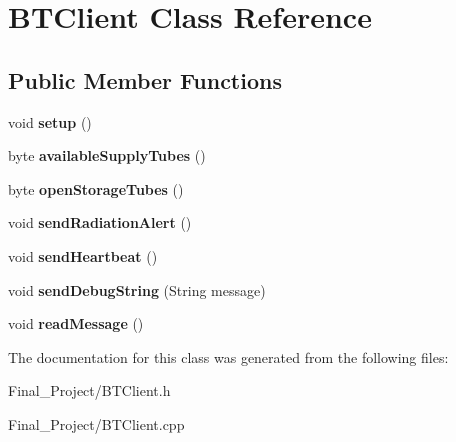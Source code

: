 \hypertarget{classBTClient}{\section{B\-T\-Client Class Reference}
\label{classBTClient}
}
\subsection*{Public Member Functions}
\begin{DoxyCompactItemize}
\item 
\hypertarget{classBTClient_aefdc156fe1f22455d249ec0bb7fa3fd5}{void {\bfseries setup} ()}\label{classBTClient_aefdc156fe1f22455d249ec0bb7fa3fd5}

\item 
\hypertarget{classBTClient_a8305c35eac468b66f6e8cfe18b331e04}{byte {\bfseries available\-Supply\-Tubes} ()}\label{classBTClient_a8305c35eac468b66f6e8cfe18b331e04}

\item 
\hypertarget{classBTClient_a4c0882cd410b694e9f9406c6e2c58dc8}{byte {\bfseries open\-Storage\-Tubes} ()}\label{classBTClient_a4c0882cd410b694e9f9406c6e2c58dc8}

\item 
\hypertarget{classBTClient_a70cc30b8de8632bd6fb81972a9409a10}{void {\bfseries send\-Radiation\-Alert} ()}\label{classBTClient_a70cc30b8de8632bd6fb81972a9409a10}

\item 
\hypertarget{classBTClient_a4bf8f58f2c83834cab585e69c55c171f}{void {\bfseries send\-Heartbeat} ()}\label{classBTClient_a4bf8f58f2c83834cab585e69c55c171f}

\item 
\hypertarget{classBTClient_a57a82b64a1233a66450c1d9ebe48774c}{void {\bfseries send\-Debug\-String} (String message)}\label{classBTClient_a57a82b64a1233a66450c1d9ebe48774c}

\item 
\hypertarget{classBTClient_a8e827d16926d45a4b7c18dda0e59837b}{void {\bfseries read\-Message} ()}\label{classBTClient_a8e827d16926d45a4b7c18dda0e59837b}

\end{DoxyCompactItemize}


The documentation for this class was generated from the following files\-:\begin{DoxyCompactItemize}
\item 
Final\-\_\-\-Project/B\-T\-Client.\-h\item 
Final\-\_\-\-Project/B\-T\-Client.\-cpp\end{DoxyCompactItemize}
